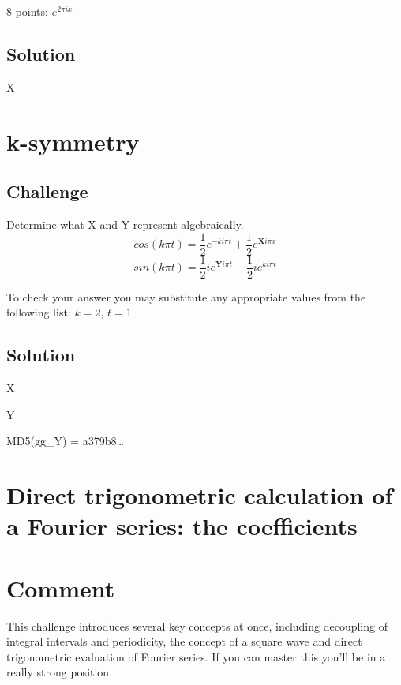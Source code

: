 8 points: $e^{2 \pi i x}$

\subsection*{Solution}
X





\newpage
\section{k-symmetry}

\subsection*{Challenge}
Determine what X and Y represent algebraically.
\begin{equation}
    cos(k \pi t) = \frac{1}{2} e^{-k i\pi t} + \frac{1}{2} e^{\bm{X} i \pi x}
\end{equation}
\begin{equation}
    sin(k \pi t) = \frac{1}{2} i e^{\bm{Y} i \pi t} - \frac{1}{2} i e^{k i \pi t}
\end{equation}

To check your answer you may substitute any appropriate values from the following list: $k=2$, $t=1$

\subsection*{Solution}
X


Y

MD5(gg\_Y) = a379b8\ldots




\newpage
\section{Direct trigonometric calculation of a Fourier series: the coefficients}
\label{sec:fs_squarewave}

\section*{Comment}
This challenge introduces several key concepts at once, including decoupling of integral intervals and periodicity, the concept of a square wave and direct trigonometric evaluation of Fourier series. If you can master this you'll be in a really strong position.

